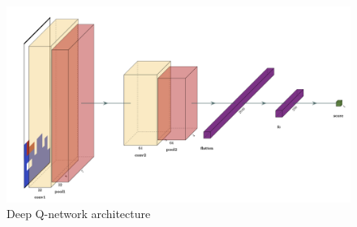 \documentclass[letterpaper]{article} %
\begin{document}
  
\newpage






\begin{figure}[b!]
  \centering
  \includegraphics[width=0.75\linewidth]{figures/DQN.png}
  \caption{Deep Q-network architecture}
  \label{fig:DQN}
\end{figure}
\newpage$\,$\newpage
\end{document}
